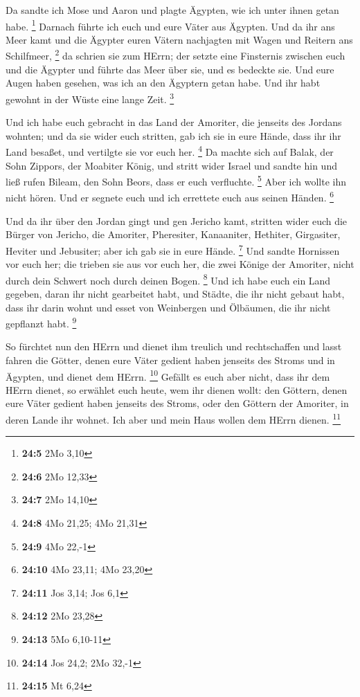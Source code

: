  Da sandte ich Mose und Aaron und plagte Ägypten, wie ich
unter ihnen getan habe. \footnote{\textbf{24:5} 2Mo 3,10} 
Darnach führte ich euch und eure Väter aus Ägypten. Und da ihr ans Meer
kamt und die Ägypter euren Vätern nachjagten mit Wagen und Reitern ans
Schilfmeer, \footnote{\textbf{24:6} 2Mo 12,33}  da schrien
sie zum HErrn; der setzte eine Finsternis zwischen euch und die Ägypter
und führte das Meer über sie, und es bedeckte sie. Und eure Augen haben
gesehen, was ich an den Ägyptern getan habe. Und ihr habt gewohnt in der
Wüste eine lange Zeit. \footnote{\textbf{24:7} 2Mo 14,10}

 Und ich habe euch gebracht in das Land der Amoriter, die
jenseits des Jordans wohnten; und da sie wider euch stritten, gab ich
sie in eure Hände, dass ihr ihr Land besaßet, und vertilgte sie vor euch
her. \footnote{\textbf{24:8} 4Mo 21,25; 4Mo 21,31}  Da
machte sich auf Balak, der Sohn Zippors, der Moabiter König, und stritt
wider Israel und sandte hin und ließ rufen Bileam, den Sohn Beors, dass
er euch verfluchte. \footnote{\textbf{24:9} 4Mo 22,-1} 
Aber ich wollte ihn nicht hören. Und er segnete euch und ich errettete
euch aus seinen Händen. \footnote{\textbf{24:10} 4Mo 23,11; 4Mo 23,20}

 Und da ihr über den Jordan gingt und gen Jericho kamt,
stritten wider euch die Bürger von Jericho, die Amoriter, Pheresiter,
Kanaaniter, Hethiter, Girgasiter, Heviter und Jebusiter; aber ich gab
sie in eure Hände. \footnote{\textbf{24:11} Jos 3,14; Jos 6,1}
 Und sandte Hornissen vor euch her; die trieben sie aus
vor euch her, die zwei Könige der Amoriter, nicht durch dein Schwert
noch durch deinen Bogen. \footnote{\textbf{24:12} 2Mo 23,28}
 Und ich habe euch ein Land gegeben, daran ihr nicht
gearbeitet habt, und Städte, die ihr nicht gebaut habt, dass ihr darin
wohnt und esset von Weinbergen und Ölbäumen, die ihr nicht gepflanzt
habt. \footnote{\textbf{24:13} 5Mo 6,10-11}

 So fürchtet nun den HErrn und dienet ihm treulich und
rechtschaffen und lasst fahren die Götter, denen eure Väter gedient
haben jenseits des Stroms und in Ägypten, und dienet dem HErrn.
\footnote{\textbf{24:14} Jos 24,2; 2Mo 32,-1}  Gefällt es
euch aber nicht, dass ihr dem HErrn dienet, so erwählet euch heute, wem
ihr dienen wollt: den Göttern, denen eure Väter gedient haben jenseits
des Stroms, oder den Göttern der Amoriter, in deren Lande ihr wohnet.
Ich aber und mein Haus wollen dem HErrn dienen. \footnote{\textbf{24:15}
  Mt 6,24}

